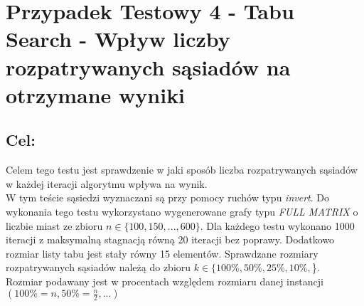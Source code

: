 \section{Przypadek Testowy 4 - Tabu Search - Wpływ liczby rozpatrywanych sąsiadów na otrzymane wyniki}
  \subsection{Cel:}
  Celem tego testu jest sprawdzenie w jaki sposób liczba rozpatrywanych sąsiadów w każdej
  iteracji algorytmu wpływa na wynik. \\
  W tym teście sąsiedzi wyznaczani są przy pomocy ruchów typu \textit{invert}. Do wykonania tego testu wykorzystano wygenerowane grafy typu \textit{FULL MATRIX} o liczbie miast ze zbioru 
  $ n \in \{100,150,...,600\} $. Dla każdego testu wykonano 1000 iteracji z maksymalną stagnacją równą 20 iteracji bez poprawy. 
  Dodatkowo rozmiar listy tabu jest stały równy 15 elementów.
  Sprawdzane rozmiary rozpatrywanych sąsiadów należą do zbioru $k \in \{100\%,50\%,25\%,10\%,$\}. \\
  Rozmiar podawany jest w procentach względem rozmiaru danej instancji $(100\%=n, 50\%=\frac{n}{2},...)$
  

